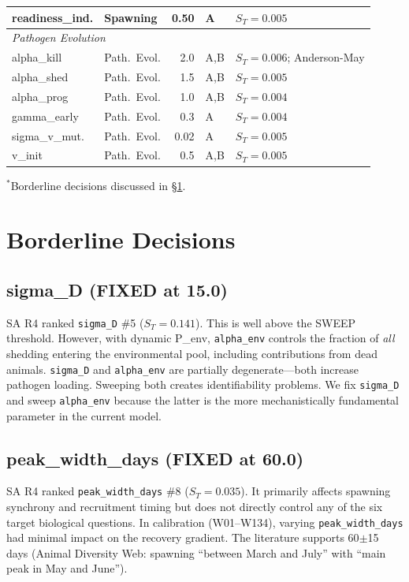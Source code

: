 \documentclass[11pt,a4paper]{article}
\begin{document}
\begin{footnotesize}
\begin{longtable}{llrlp{5.5cm}}
readiness\_ind. & Spawning & 0.50 & A & $S_T = 0.005$ \\
\midrule
\multicolumn{5}{l}{\textit{Pathogen Evolution}} \\
\midrule
alpha\_kill & Path.\ Evol. & 2.0 & A,B & $S_T = 0.006$; Anderson-May \\
alpha\_shed & Path.\ Evol. & 1.5 & A,B & $S_T = 0.005$ \\
alpha\_prog & Path.\ Evol. & 1.0 & A,B & $S_T = 0.004$ \\
gamma\_early & Path.\ Evol. & 0.3 & A & $S_T = 0.004$ \\
sigma\_v\_mut. & Path.\ Evol. & 0.02 & A & $S_T = 0.005$ \\
v\_init & Path.\ Evol. & 0.5 & A,B & $S_T = 0.005$ \\
\bottomrule
\end{longtable}
\end{footnotesize}

\noindent $^*$Borderline decisions discussed in \S\ref{sec:borderline}.

\section{Borderline Decisions}
\label{sec:borderline}

\subsection{sigma\_D (FIXED at 15.0)}

SA R4 ranked \texttt{sigma\_D} \#5 ($S_T = 0.141$). This is well above the SWEEP threshold. However, with dynamic P\_env, \texttt{alpha\_env} controls the fraction of \textit{all} shedding entering the environmental pool, including contributions from dead animals. \texttt{sigma\_D} and \texttt{alpha\_env} are partially degenerate---both increase pathogen loading. Sweeping both creates identifiability problems. We fix \texttt{sigma\_D} and sweep \texttt{alpha\_env} because the latter is the more mechanistically fundamental parameter in the current model.

\subsection{peak\_width\_days (FIXED at 60.0)}

SA R4 ranked \texttt{peak\_width\_days} \#8 ($S_T = 0.035$). It primarily affects spawning synchrony and recruitment timing but does not directly control any of the six target biological questions. In calibration (W01--W134), varying \texttt{peak\_width\_days} had minimal impact on the recovery gradient. The literature supports 60$\pm$15 days (Animal Diversity Web: spawning ``between March and July'' with ``main peak in May and June'').
\end{document}
